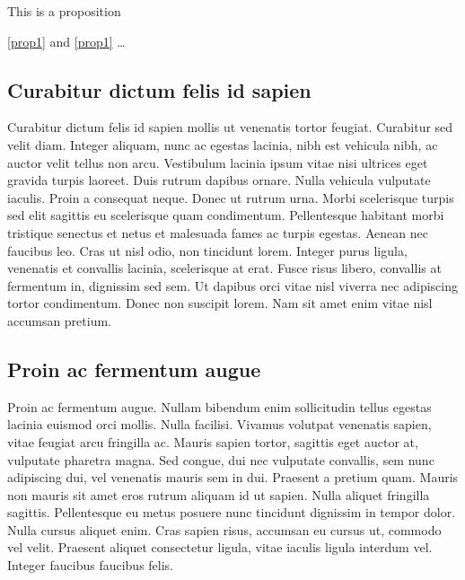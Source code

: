 \documentclass[a4paper,UKenglish,cleveref, autoref]{lipics-v2019}
\begin{document}
\begin{proposition}\label{prop1}
This is a proposition
\end{proposition}

\autoref{prop1} and \cref{prop1} \ldots

\subsection{Curabitur dictum felis id sapien}

Curabitur dictum  felis id sapien mollis ut venenatis tortor feugiat. Curabitur sed velit diam. Integer aliquam, nunc ac egestas lacinia, nibh est vehicula nibh, ac auctor velit tellus non arcu. Vestibulum lacinia ipsum vitae nisi ultrices eget gravida turpis laoreet. Duis rutrum dapibus ornare. Nulla vehicula vulputate iaculis. Proin a consequat neque. Donec ut rutrum urna. Morbi scelerisque turpis sed elit sagittis eu scelerisque quam condimentum. Pellentesque habitant morbi tristique senectus et netus et malesuada fames ac turpis egestas. Aenean nec faucibus leo. Cras ut nisl odio, non tincidunt lorem. Integer purus ligula, venenatis et convallis lacinia, scelerisque at erat. Fusce risus libero, convallis at fermentum in, dignissim sed sem. Ut dapibus orci vitae nisl viverra nec adipiscing tortor condimentum. Donec non suscipit lorem. Nam sit amet enim vitae nisl accumsan pretium. 



\subsection{Proin ac fermentum augue}

Proin ac fermentum augue. Nullam bibendum enim sollicitudin tellus egestas lacinia euismod orci mollis. Nulla facilisi. Vivamus volutpat venenatis sapien, vitae feugiat arcu fringilla ac. Mauris sapien tortor, sagittis eget auctor at, vulputate pharetra magna. Sed congue, dui nec vulputate convallis, sem nunc adipiscing dui, vel venenatis mauris sem in dui. Praesent a pretium quam. Mauris non mauris sit amet eros rutrum aliquam id ut sapien. Nulla aliquet fringilla sagittis. Pellentesque eu metus posuere nunc tincidunt dignissim in tempor dolor. Nulla cursus aliquet enim. Cras sapien risus, accumsan eu cursus ut, commodo vel velit. Praesent aliquet consectetur ligula, vitae iaculis ligula interdum vel. Integer faucibus faucibus felis. 
\end{document}
